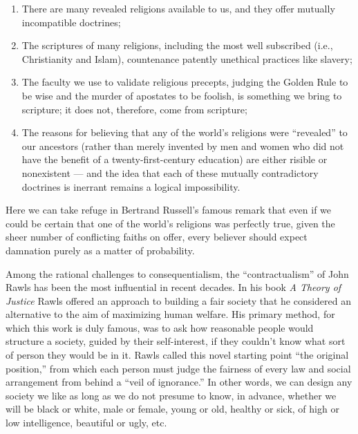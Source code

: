 \documentclass[a4paper,14pt]{extarticle}
\begin{document}
\begin{enumerate}
      \item There are many revealed religions available to us, and they offer mutually incompatible doctrines;
      \item The scriptures of many religions, including the most well subscribed (i.e., Christianity and Islam), countenance patently unethical practices like slavery;
      \item The faculty we use to validate religious precepts, judging the Golden Rule to be wise and the murder of apostates to be foolish, is something we bring to scripture;
            it does not, therefore, come from scripture;
      \item The reasons for believing that any of the world's religions were ``revealed'' to our ancestors (rather than merely invented by men and women who did not have the benefit of a twenty-first-century education) are either risible or nonexistent --- and the idea that each of these mutually contradictory doctrines is inerrant remains a logical impossibility.
\end{enumerate}

Here we can take refuge in Bertrand Russell's famous remark that even if we could be certain that one of the world's religions was perfectly true, given the sheer number of conflicting faiths on offer, every believer should expect damnation purely as a matter of probability.

Among the rational challenges to consequentialism, the ``contractualism'' of John Rawls has been the most influential in recent decades.
In his book \textit{A Theory of Justice} Rawls offered an approach to building a fair society that he considered an alternative to the aim of maximizing human welfare.
His primary method, for which this work is duly famous, was to ask how reasonable people would structure a society, guided by their self-interest, if they couldn't know what sort of person they would be in it.
Rawls called this novel starting point ``the original position,'' from which each person must judge the fairness of every law and social arrangement from behind a ``veil of ignorance.''
In other words, we can design any society we like as long as we do not presume to know, in advance, whether we will be black or white, male or female, young or old, healthy or sick, of high or low intelligence, beautiful or ugly, etc.
\end{document}
